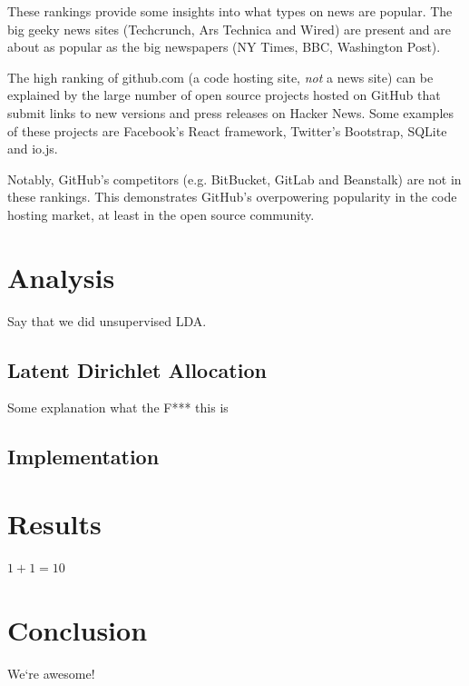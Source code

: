 These rankings provide some insights into what types on news are popular. The big geeky news sites (Techcrunch, Ars Technica and Wired) are present and are about as popular as the big newspapers (NY Times, BBC, Washington Post). 

The high ranking of github.com (a code hosting site, \textit{not} a news site) can be explained by the large number of open source projects hosted on GitHub that submit links to new versions and press releases on Hacker News. Some examples of these projects are Facebook's React framework, Twitter's Bootstrap, SQLite and io.js. 

Notably, GitHub's competitors (e.g. BitBucket, GitLab and Beanstalk) are not in these rankings. This demonstrates GitHub's overpowering popularity in the code hosting market, at least in the open source community.

\section{Analysis}
Say that we did unsupervised LDA.

\subsection{Latent Dirichlet Allocation}
Some explanation what the F*** this is

\subsection{Implementation}

\section{Results}
$1+1=10$

\section{Conclusion}
We`re awesome!